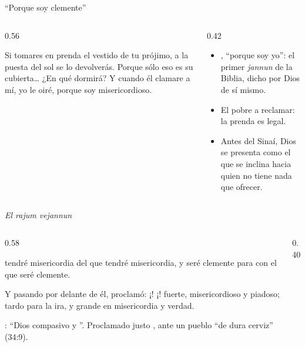 \begin{frame}{``Porque soy clemente''}
\begin{columns}[c,onlytextwidth]
\begin{column}{0.56\textwidth}
\centering{}
\begin{cita}Si tomares en prenda el vestido de tu prójimo, a la puesta del sol se lo devolverás. Porque sólo eso es su cubierta\ldots{} ¿En qué dormirá? Y cuando él clamare a mí, yo le oiré, porque soy misericordioso.\end{cita}
\end{column}
\begin{column}{0.42\textwidth}\small\RaggedRight
\begin{itemize}
\item {}, ``porque  soy yo'': el primer \emph{jannun} de la Biblia, dicho por Dios de sí mismo.
\item El pobre  a reclamar: la prenda es legal.
\item Antes del Sinaí, Dios se presenta como el que se inclina hacia quien no tiene nada que ofrecer.
\end{itemize}
\end{column}
\end{columns}
\end{frame}

\begin{frame}{\emph{El rajum vejannun}}
\begin{columns}[c,onlytextwidth]
\begin{column}{0.58\textwidth}
\begin{cita}tendré misericordia del que tendré misericordia, y seré clemente para con el que seré clemente.\end{cita}
\begin{cita}Y pasando \SENOR{} por delante de él, proclamó: ¡\SENOR! ¡\SENOR! fuerte, misericordioso y piadoso; tardo para la ira, y grande en misericordia y verdad.\end{cita}
\scriptsize {}: ``Dios compasivo y ''. Proclamado justo , ante un pueblo ``de dura cerviz'' (34:9).
\end{column}
\begin{column}{0.40\textwidth}\end{column}
\end{columns}
\end{frame}

